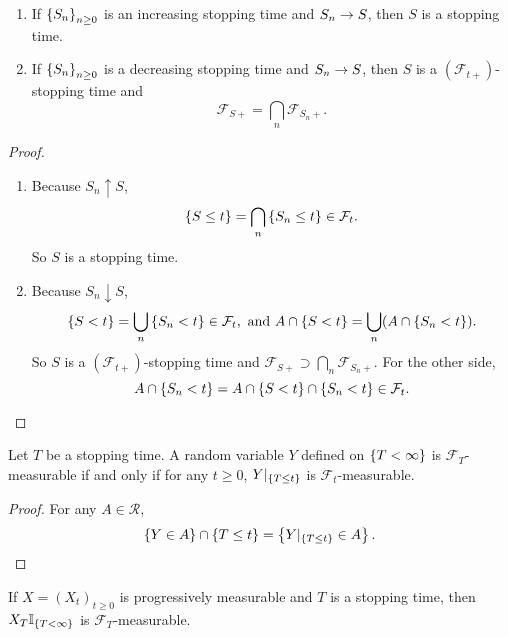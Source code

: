 \begin{prop}
    \begin{enumerate}[label=(\arabic{*})]
        \item If $\left\{S_n\right\}_{n \geq 0}$ is an increasing stopping time and $S_n \rightarrow S$, then $S$ is a stopping time.
        \item If $\left\{S_n\right\}_{n \geq 0}$ is a decreasing stopping time and $S_n \rightarrow S$, then $S$ is a $(\mathcal{F}_{t+})$-stopping time and
        \begin{equation*}
            \mathcal{F}_{S+} = \bigcap_{n} \mathcal{F}_{S_n+}.
        \end{equation*}
    \end{enumerate}
\end{prop}
\begin{proof}
    \begin{enumerate}[label=(\arabic{*})]
        \item Because $S_n \uparrow S$,
        \begin{equation*}
            \left\{S \leq t\right\} = \bigcap_n \left\{S_n \leq t\right\} \in \mathcal{F}_t.
        \end{equation*}
        So $S$ is a stopping time.

        \item Because $S_n \downarrow S$,
        \begin{equation*}
            \left\{S < t\right\} = \bigcup_{n} \left\{S_n < t\right\} \in \mathcal{F}_t,\text{ and }A \cap \left\{S < t\right\} = \bigcup_{n} (A \cap \left\{S_n < t\right\}).
        \end{equation*}
        So $S$ is a $(\mathcal{F}_{t+})$-stopping time and $\mathcal{F}_{S+} \supset \bigcap_{n} \mathcal{F}_{S_n+}$. For the other side,
        \begin{equation*}
            A \cap \left\{S_n < t\right\} = A \cap \left\{S < t\right\} \cap \left\{S_n < t\right\} \in \mathcal{F}_t. \qedhere
        \end{equation*}
    \end{enumerate}
\end{proof}

\begin{prop}
    Let $T$ be a stopping time. A random variable $Y$ defined on $\left\{T <\infty\right\}$ is $\mathcal{F}_T$-measurable if and only if for any $t \geq 0$, $Y|_{\left\{T \leq t\right\}}$ is $\mathcal{F}_t$-measurable.
\end{prop}
\begin{proof}
    For any $A \in \mathcal{R}$,
    \begin{equation*}
        \left\{Y \in A\right\} \cap \left\{T \leq t\right\} = \left\{Y|_{\left\{T \leq t\right\}} \in A\right\}. \qedhere
    \end{equation*}
\end{proof}
\begin{rmk}
    If $X = (X_t)_{t \geq 0}$ is progressively measurable and $T$ is a stopping time, then $X_T\mathbb{I}_{\left\{T<\infty\right\}}$ is $\mathcal{F}_T$-measurable.
\end{rmk}

